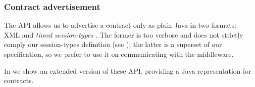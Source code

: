 \subsubsection{Contract advertisement}
The API allows us to advertise a contract only as plain Java  in two formats: XML and \textit{timed session-types} \cite{Bartoletti15forte}. The former is too verbose and does not strictly comply our session-types definition (see ); the latter is a superset of our specification, so we prefer to use it on communicating with the middleware.

In  we show an extended version of these API, providing a Java representation for contracts.


